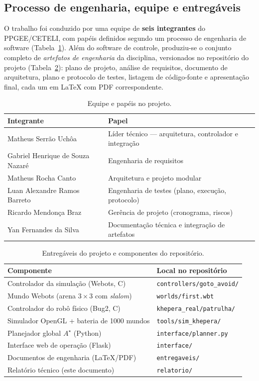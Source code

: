 \documentclass[11pt,a4paper]{article}
\begin{document}
\subsection{Processo de engenharia, equipe e entregáveis}\label{sec:equipe}
O trabalho foi conduzido por uma equipe de \textbf{seis integrantes} do PPGEE/CETELI, com papéis definidos segundo um processo de engenharia de software (Tabela~\ref{tab:equipe}). Além do software de controle, produziu-se o conjunto completo de \emph{artefatos de engenharia} da disciplina, versionados no repositório do projeto (Tabela~\ref{tab:entreg}): plano de projeto, análise de requisitos, documento de arquitetura, plano e protocolo de testes, listagem de código-fonte e apresentação final, cada um em \LaTeX{} com PDF correspondente.

\begin{table}[H]
\centering
\caption{Equipe e papéis no projeto.}
\label{tab:equipe}
\begin{tabular}{@{}ll@{}}
\toprule
\textbf{Integrante} & \textbf{Papel} \\
\midrule
Matheus Serrão Uchôa & Líder técnico --- arquitetura, controlador e integração \\
Gabriel Henrique de Souza Nazaré & Engenharia de requisitos \\
Matheus Rocha Canto & Arquitetura e projeto modular \\
Luan Alexandre Ramos Barreto & Engenharia de testes (plano, execução, protocolo) \\
Ricardo Mendonça Braz & Gerência de projeto (cronograma, riscos) \\
Yan Fernandes da Silva & Documentação técnica e integração de artefatos \\
\bottomrule
\end{tabular}
\end{table}

\begin{table}[H]
\centering
\caption{Entregáveis do projeto e componentes do repositório.}
\label{tab:entreg}
\begin{tabular}{@{}ll@{}}
\toprule
\textbf{Componente} & \textbf{Local no repositório} \\
\midrule
Controlador da simulação (Webots, C) & \texttt{controllers/goto\_avoid/} \\
Mundo Webots (arena $3\times3$ com \emph{slalom}) & \texttt{worlds/first.wbt} \\
Controlador do robô físico (Bug2, C) & \texttt{khepera\_real/patrulha/} \\
Simulador OpenGL + bateria de 1000 mundos & \texttt{tools/sim\_khepera/} \\
Planejador global $A^\star$ (Python) & \texttt{interface/planner.py} \\
Interface web de operação (Flask) & \texttt{interface/} \\
Documentos de engenharia (\LaTeX/PDF) & \texttt{entregaveis/} \\
Relatório técnico (este documento) & \texttt{relatorio/} \\
\bottomrule
\end{tabular}
\end{table}
\end{document}
